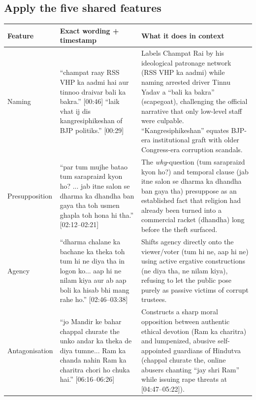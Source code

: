 \documentclass[10pt,a4paper]{article}
\begin{document}
\subsection*{Apply the five shared features}
\par\vspace{4pt}
{\small
\begin{longtable}{@{}>{\raggedright\arraybackslash}p{} >{\raggedright\arraybackslash}p{} >{\raggedright\arraybackslash}p{}@{}}
\toprule
\textbf{Feature} & \textbf{Exact wording + timestamp} & \textbf{What it does in context} \\
\midrule
\endhead
Naming & ``champat raay RSS VHP ka aadmi hai aur tinnoo draivar bali ka bakra.'' [00:46] \newline  ``laik vhat ij dis kangresiphikeshan of BJP politiks.'' [00:29] & Labels Champat Rai by his ideological patronage network (RSS VHP ka aadmi) while naming arrested driver Tinnu Yadav a ``bali ka bakra'' (scapegoat), challenging the official narrative that only low-level staff were culpable. ``Kangresiphikeshan'' equates BJP-era institutional graft with older Congress-era corruption scandals. \\
\addlinespace[6pt]
Presupposition & ``par tum mujhe batao tum sarapraizd kyon ho? ... jab itne salon se dharma ka dhandha ban gaya tha toh usmen ghapla toh hona hi tha.'' [02:12--02:21] & The \emph{why}-question (tum sarapraizd kyon ho?) and temporal clause (jab itne salon se dharma ka dhandha ban gaya tha) presuppose as an established fact that religion had already been turned into a commercial racket (dhandha) long before the theft surfaced. \\
\addlinespace[6pt]
Agency & ``dharma chalane ka bachane ka theka toh tum hi ne diya tha in logon ko... aap hi ne nilam kiya aur ab aap boli ka hisab bhi mang rahe ho.'' [02:46--03:38] & Shifts agency directly onto the viewer/voter (tum hi ne, aap hi ne) using active ergative constructions (ne diya tha, ne nilam kiya), refusing to let the public pose purely as passive victims of corrupt trustees. \\
\addlinespace[6pt]
Antagonisation & ``jo Mandir ke bahar chappal churate the unko andar ka theka de diya tumne... Ram ka chanda nahin Ram ka charitra chori ho chuka hai.'' [06:16--06:26] & Constructs a sharp moral opposition between authentic ethical devotion (Ram ka charitra) and lumpenized, abusive self-appointed guardians of Hindutva (chappal churate the, online abusers chanting ``jay shri Ram'' while issuing rape threats at [04:47--05:22]). \\

\end{longtable}}
\end{document}
